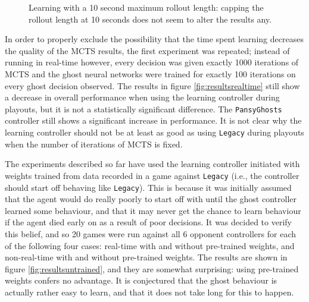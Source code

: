 \begin{figure}
\centering
{}
\caption[Learning with a 10 second maximum rollout length]{Learning with a 10 second maximum rollout length: capping the rollout length at 10 seconds does not seem to alter the results any.}
\label{fig:resultssr}
\end{figure}

In order to properly exclude the possibility that the time spent learning decreases the quality of the MCTS results, the first experiment was repeated; instead of running in real-time however, every decision was given exactly 1000 iterations of MCTS and the ghost neural networks were trained for exactly 100 iterations on every ghost decision observed.  The results in figure \ref{fig:resultsrealtime} still show a decrease in overall performance when using the learning controller during playouts, but it is not a statistically significant difference.  The {\tt PansyGhosts} controller still shows a significant increase in performance.  It is not clear why the learning controller should not be at least as good as using {\tt Legacy} during playouts when the number of iterations of MCTS is fixed.

The experiments described so far have used the learning controller initiated with weights trained from data recorded in a game against {\tt Legacy} (i.e., the controller should start off behaving like {\tt Legacy}).  This is because it was initially assumed that the agent would do really poorly to start off with until the ghost controller learned some behaviour, and that it may never get the chance to learn behaviour if the agent died early on as a result of poor decisions.  It was decided to verify this belief, and so 20 games were run against all 6 opponent controllers for each of the following four cases: real-time with and without pre-trained weights, and non-real-time with and without pre-trained weights.  The results are shown in figure \ref{fig:resultsuntrained}, and they are somewhat surprising: using pre-trained weights confers no advantage.  It is conjectured that the ghost behaviour is actually rather easy to learn, and that it does not take long for this to happen.

